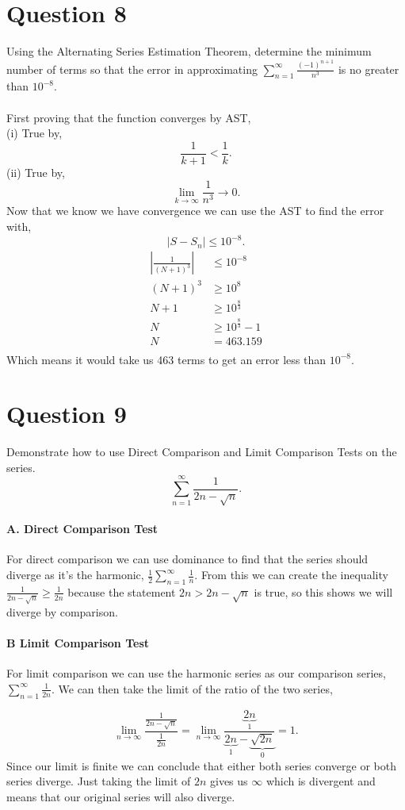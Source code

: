 \documentclass[a4paper]{article}
\begin{document}
\section*{Question 8}%
\label{sec:Question 8}
Using the Alternating Series Estimation Theorem, determine the minimum number of terms so that the error in approximating $ \sum_{ n=1 } ^{ \infty } \frac{ \left( -1 \right) ^{ n+1 } }{ n^3 } $ is no greater than $ 10^{ -8 } $. \\ \\ 
First proving that the function converges by AST, \\
(i) True by,
\[
\frac{ 1 }{ k+1 } < \frac{ 1 }{ k } 
.\] 
(ii) True by,
\[
\lim_{ k \to \infty} \frac{ 1 }{ n^3 } \to 0
.\] 
Now that we know we have convergence we can use the AST to find the error with,
\[
\left| S-S_n \right| \le 10^{ -8 }
.\] 
\begin{align*}
	\left| \frac{ 1 }{ \left( N+1 \right) ^3 }  \right| &\le 10^{ -8 } \\
	\left( N+1 \right) ^3 &\ge 10^{ 8 } \\
	N+1 &\ge 10^{ \frac{ 8 }{ 3 }  } \\
	N & \ge 10^{ \frac{ 8 }{ 3 }  }- 1 \\
	N &= 463.159 \\
\end{align*}
Which means it would take us 463 terms to get an error less than $ 10^{ -8 } $.

\section*{Question 9}%
\label{sec:Question 9}
Demonstrate how to use Direct Comparison and Limit Comparison Tests on the series.  
\[
\sum_{ n=1 } ^{ \infty } \frac{ 1 }{ 2n-\sqrt{ n} } 
.\] 
\paragraph{A. Direct Comparison Test \\}
For direct comparison we can use dominance to find that the series should diverge as it's the harmonic, $ \frac{ 1 }{ 2 } \sum_{ n=1 } ^{ \infty } \frac{ 1 }{ n }  $. From this we can create the inequality $ \frac{ 1 }{ 2n-\sqrt{ n} } \ge \frac{ 1 }{ 2n } $ because the statement $ 2n > 2n -\sqrt{ n} $ is true, so this shows we will diverge by comparison.

\paragraph{B Limit Comparison Test \\}
For limit comparison we can use the harmonic series as our comparison series, $ \sum_{ n=1 } ^{ \infty } \frac{ 1 }{ 2n }  $. We can then take the limit of the ratio of the two series,

\[
\lim_{ n \to \infty} \frac{ \frac{ 1 }{ 2n-\sqrt{ n} }  }{ \frac{ 1 }{ 2n }  }= \lim_{ n \to \infty} \frac{ \underbrace{ 2n }_{ 1 } }{ \underbrace{ 2n }_{ 1 } - \underbrace{ \sqrt{ 2n} }_{ 0 }  } = 1
.\] 
Since our limit is finite we can conclude that either both series converge or both series diverge. Just taking the limit of $ 2n $ gives us $ \infty $ which is divergent and means that our original series will also diverge.  
\end{document}
